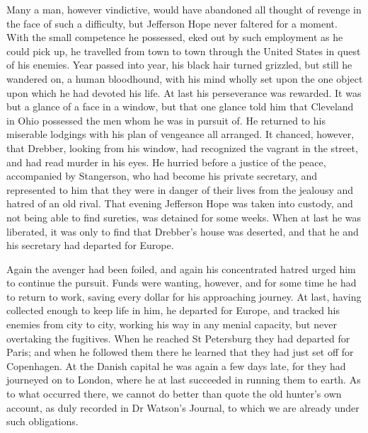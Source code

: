 Many a man, however vindictive, would have abandoned all thought of revenge in the face of such a difficulty, but Jefferson Hope never faltered for a moment. With the small competence he possessed, eked out by such employment as he could pick up, he travelled from town to town through the United States in quest of his enemies. Year passed into year, his black hair turned grizzled, but still he wandered on, a human bloodhound, with his mind wholly set upon the one object upon which he had devoted his life. At last his perseverance was rewarded. It was but a glance of a face in a window, but that one glance told him that Cleveland in Ohio possessed the men whom he was in pursuit of. He returned to his miserable lodgings with his plan of vengeance all arranged. It chanced, however, that Drebber, looking from his window, had recognized the vagrant in the street, and had read murder in his eyes. He hurried before a justice of the peace, accompanied by Stangerson, who had become his private secretary, and represented to him that they were in danger of their lives from the jealousy and hatred of an old rival. That evening Jefferson Hope was taken into custody, and not being able to find sureties, was detained for some weeks. When at last he was liberated, it was only to find that Drebber's house was deserted, and that he and his secretary had departed for Europe.

Again the avenger had been foiled, and again his concentrated hatred urged him to continue the pursuit. Funds were wanting, however, and for some time he had to return to work, saving every dollar for his approaching journey. At last, having collected enough to keep life in him, he departed for Europe, and tracked his enemies from city to city, working his way in any menial capacity, but never overtaking the fugitives. When he reached St Petersburg they had departed for Paris; and when he followed them there he learned that they had just set off for Copenhagen. At the Danish capital he was again a few days late, for they had journeyed on to London, where he at last succeeded in running them to earth. As to what occurred there, we cannot do better than quote the old hunter's own account, as duly recorded in Dr Watson's Journal, to which we are already under such obligations.